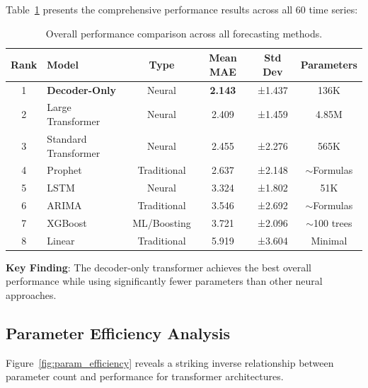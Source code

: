 \documentclass[11pt]{article}
\begin{document}
Table~\ref{tab:overall_results} presents the comprehensive performance results across all 60 time series:

\begin{table}[h]
\centering
\begin{tabular}{@{}clcccc@{}}
\toprule
Rank & Model & Type & Mean MAE & Std Dev & Parameters \\
\midrule
1 & \textbf{Decoder-Only} & Neural & \textbf{2.143} & ±1.437 & 136K \\
2 & Large Transformer & Neural & 2.409 & ±1.459 & 4.85M \\
3 & Standard Transformer & Neural & 2.455 & ±2.276 & 565K \\
4 & Prophet & Traditional & 2.637 & ±2.148 & $\sim$Formulas \\
5 & LSTM & Neural & 3.324 & ±1.802 & 51K \\
6 & ARIMA & Traditional & 3.546 & ±2.692 & $\sim$Formulas \\
7 & XGBoost & ML/Boosting & 3.721 & ±2.096 & $\sim$100 trees \\
8 & Linear & Traditional & 5.919 & ±3.604 & Minimal \\
\bottomrule
\end{tabular}
\caption{Overall performance comparison across all forecasting methods.}
\label{tab:overall_results}
\end{table}

\textbf{Key Finding}: The decoder-only transformer achieves the best overall performance while using significantly fewer parameters than other neural approaches.

\subsection{Parameter Efficiency Analysis}

Figure~\ref{fig:param_efficiency} reveals a striking inverse relationship between parameter count and performance for transformer architectures.
\end{document}
